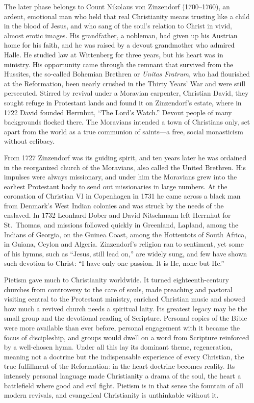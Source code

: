 The later phase belongs to Count Nikolaus von Zinzendorf (1700--1760), an ardent, emotional man who held that real Christianity means trusting like a child in the blood of Jesus, and who sang of the soul's
relation to Christ in vivid, almost erotic images. His grandfather, a nobleman, had given up his Austrian home for his faith, and he was raised by a devout grandmother who admired Halle. He studied law at
Wittenberg for three years, but his heart was in ministry. His opportunity came through the remnant
that survived from the Hussites, the so-called Bohemian Brethren or \emph{Unitas Fratrum}, who had flourished at the
Reformation, been nearly crushed in the Thirty Years' War and were still persecuted. Stirred by
revival under a Moravian carpenter, Christian David, they sought refuge in Protestant lands and found
it on Zinzendorf's estate, where in 1722 David founded Herrnhut, ``The Lord's Watch.'' Devout people
of many backgrounds flocked there. The Moravians intended a town of Christians only, set apart from the world as a true communion of saints---a free, social monasticism without celibacy.

From 1727 Zinzendorf was its guiding spirit, and ten years later he was ordained in the reorganized church of the Moravians, also called the United Brethren. His impulses were always missionary, and under him the Moravians grew into the earliest Protestant body to send out missionaries in large numbers. At the coronation of Christian VI in
Copenhagen in 1731 he came across a black man from Denmark's West Indian colonies and was struck by the needs of the
enslaved. In 1732 Leonhard Dober and David Nitschmann left Herrnhut for St.~Thomas, and missions
followed quickly in Greenland, Lapland, among the Indians of Georgia, on the Guinea Coast, among the
Hottentots of South Africa, in Guiana, Ceylon and Algeria. Zinzendorf's religion ran to sentiment,
yet some of his hymns, such as ``Jesus, still lead on,'' are widely sung, and few have shown such
devotion to Christ: ``I have only one passion. It is He, none but He.''

Pietism gave much to Christianity worldwide. It turned eighteenth-century churches from controversy
to the care of souls, made preaching and pastoral visiting central to the Protestant ministry,
enriched Christian music and showed how much a revived church needs a spiritual laity. Its greatest
legacy may be the small group and the devotional reading of Scripture. Personal copies of the Bible
were more available than ever before, personal engagement with it became the focus of discipleship,
and groups would dwell on a word from Scripture reinforced by a well-chosen hymn. Under all this lay
its dominant theme, regeneration, meaning not a doctrine but the indispensable experience of every
Christian, the true fulfillment of the Reformation: in the heart doctrine becomes reality. Its
intensely personal language made Christianity a drama of the soul, the heart a battlefield where good and evil fight. Pietism is in that sense the fountain of all modern revivals, and evangelical Christianity
is unthinkable without it.

